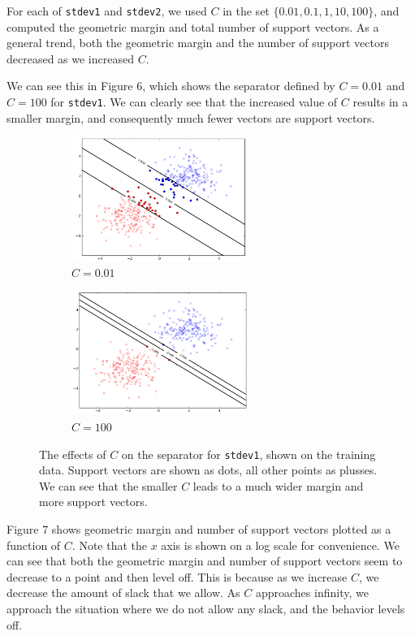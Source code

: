 \documentclass{sigchi}
\begin{document}
For each of \texttt{stdev1} and \texttt{stdev2}, we used $C$ in the set $\{0.01, 0.1, 1, 10, 100\}$, and computed the geometric margin and total number of support vectors. As a general trend, both the geometric margin and the number of support vectors decreased as we increased $C$. %

We can see this in Figure 6, which shows the separator defined by $C = 0.01$ and $C = 100$ for \texttt{stdev1}. We can clearly see that the increased value of $C$ results in a smaller margin, and consequently much fewer vectors are support vectors.

\begin{figure}
\centering

\begin{subfigure}[b]{2.25in}
	\includegraphics[width = 2.25in]{plots/1-3/casey/c01.png}
	\caption{$C = 0.01$}
\end{subfigure}

\begin{subfigure}[b]{2.25in}
	\includegraphics[width = 2.25in]{plots/1-3/casey/c100.png}
	\caption{$C = 100$}
\end{subfigure}
\caption{The effects of $C$ on the separator for \texttt{stdev1}, shown on the training data. Support vectors are shown as dots, all other points as plusses. We can see that the smaller $C$ leads to a much wider margin and more support vectors.}
\end{figure}

Figure 7 shows geometric margin and number of support vectors plotted as a function of $C$. Note that the $x$ axis is shown on a log scale for convenience. We can see that both the geometric margin and number of support vectors seem to decrease to a point and then level off. This is because as we increase $C$, we decrease the amount of slack that we allow. As $C$ approaches infinity, we approach the situation where we do not allow any slack, and the behavior levels off.
\end{document}
